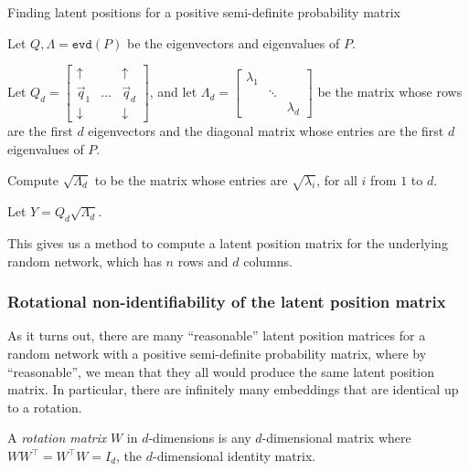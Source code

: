 \begin{algorithm}[h]\caption{Finding latent positions for a positive semi-definite probability matrix}
\label{alg:ch6:evd}
\SetAlgoLined
Let $Q, \Lambda = \texttt{evd}(P)$ be the eigenvectors and eigenvalues of $P$.

Let $Q_d = \begin{bmatrix}
    \uparrow & & \uparrow \\
    \vec q_1 & \hdots & \vec q_d \\
    \downarrow & & \downarrow
\end{bmatrix}$, and let $\Lambda_d = \begin{bmatrix}
    \lambda_1 & & \\
    & \ddots & \\
    & & \lambda_d
\end{bmatrix}$ be the matrix whose rows are the first $d$ eigenvectors and the diagonal matrix whose entries are the first $d$ eigenvalues of $P$.

Compute $\sqrt{\Lambda_d}$ to be the matrix whose entries are $\sqrt{\lambda_i}$, for all $i$ from $1$ to $d$.

Let $Y = Q_d \sqrt{\Lambda_d}$.

\end{algorithm}

This gives us a method to compute a latent position matrix for the underlying random network, which has $n$ rows and $d$ columns. 


\subsubsection{Rotational non-identifiability of the latent position matrix}
\label{sec:ch6:spectral:nonidentifiable}
As it turns out, there are many ``reasonable'' latent position matrices for a random network with a positive semi-definite probability matrix, where by ``reasonable'', we mean that they all would produce the same latent position matrix. In particular, there are infinitely many embeddings that are identical up to a rotation.

A \textit{rotation matrix} $W$ in $d$-dimensions is any $d$-dimensional matrix where $WW^\top = W^\top W = I_d$, the $d$-dimensional identity matrix.

